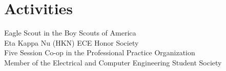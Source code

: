 \documentclass[letterpaper]{deedy-resume} %
\begin{document}
\begin{minipage}[t]{0.33\textwidth}
\sectionspace %



\section{Activities} 
\textbullet{} Eagle Scout in the Boy Scouts of America \\ 
\textbullet{} Eta Kappa Nu (HKN) ECE Honor Society  \\
\textbullet{} Five Session Co-op in the Professional Practice Organization \\
\textbullet{} Member of the Electrical and Computer Engineering Student Society

\sectionspace %


\end{minipage} %
\hfill
%
%
\end{document}
